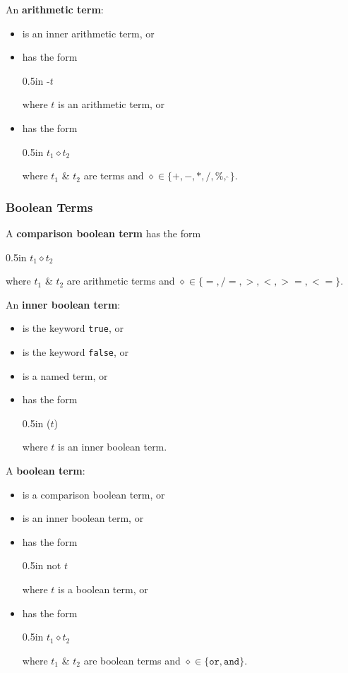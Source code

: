 \documentclass[letterpaper, 12pt]{extarticle}
\theoremstyle{definition} %
\newcommand{\textdef}[1]{\textbf{#1}}
\newcommand{\code}[1]{\texttt{#1}}
\newcommand{\set}[1]{\{#1\}}
\newcommand{\op}{\diamond}
\newenvironment{codeblock}
    {\begin{addmargin}{0.5in} \ttfamily}
    {\end{addmargin}}
\begin{document}
An \textdef{arithmetic term}:
\begin{itemize}
\item
is an inner arithmetic term, or
\item
has the form
\begin{codeblock}
-$t$
\end{codeblock}
where $t$ is an arithmetic term, or
\item
has the form
\begin{codeblock}
$t_1 \op t_2$
\end{codeblock}
where $t_1$ \& $t_2$ are terms and
$\op \in \set{+, -, *, /, \%, \hat~}$.
\end{itemize}

\subsubsection{Boolean Terms}

A \textdef{comparison boolean term} has the form
\begin{codeblock}
$t_1 \op t_2$
\end{codeblock}
where $t_1$ \& $t_2$ are arithmetic terms and
$\op \in \set{=, /=, >, <, >=, <=}$.

An \textdef{inner boolean term}:
\begin{itemize}
\item
is the keyword \code{true}, or
\item
is the keyword \code{false}, or
\item
is a named term, or
\item
has the form
\begin{codeblock}
($t$)
\end{codeblock}
where $t$ is an inner boolean term.
\end{itemize}

A \textdef{boolean term}:
\begin{itemize}
\item
is a comparison boolean term, or
\item
is an inner boolean term, or
\item
has the form
\begin{codeblock}
not $t$
\end{codeblock}
where $t$ is a boolean term, or
\item
has the form
\begin{codeblock}
$t_1 \op t_2$
\end{codeblock}
where $t_1$ \& $t_2$ are boolean terms and
$\op \in \set{\code{or}, \code{and}}$.
\end{itemize}
\end{document}
